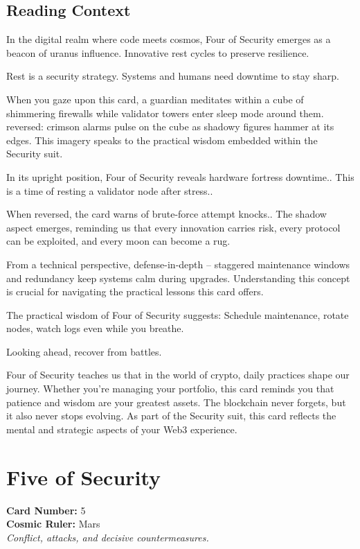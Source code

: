 \documentclass[11pt,oneside]{book}
\begin{document}
\begin{minipage}[t]{0.55\textwidth}
  \subsection*{Reading Context}
  In the digital realm where code meets cosmos, Four of Security emerges as a beacon of uranus influence. Innovative rest cycles to preserve resilience.

  Rest is a security strategy. Systems and humans need downtime to stay sharp.

  When you gaze upon this card, a guardian meditates within a cube of shimmering firewalls while validator towers enter sleep mode around them. reversed: crimson alarms pulse on the cube as shadowy figures hammer at its edges. This imagery speaks to the practical wisdom embedded within the Security suit.

  In its upright position, Four of Security reveals hardware fortress downtime.. This is a time of resting a validator node after stress..

  When reversed, the card warns of brute-force attempt knocks.. The shadow aspect emerges, reminding us that every innovation carries risk, every protocol can be exploited, and every moon can become a rug.

  From a technical perspective, defense-in-depth – staggered maintenance windows and redundancy keep systems calm during upgrades. Understanding this concept is crucial for navigating the practical lessons this card offers.

  The practical wisdom of Four of Security suggests: Schedule maintenance, rotate nodes, watch logs even while you breathe.

  Looking ahead, recover from battles.

  Four of Security teaches us that in the world of crypto, daily practices shape our journey. Whether you're managing your portfolio, this card reminds you that patience and wisdom are your greatest assets. The blockchain never forgets, but it also never stops evolving. As part of the Security suit, this card reflects the mental and strategic aspects of your Web3 experience.

\end{minipage}

\newpage
\section*{Five of Security}

\begin{minipage}[t]{0.55\textwidth}
  \vspace{0pt}
  \textbf{Card Number:} 5\\  \textbf{Cosmic Ruler:} Mars\\  \textit{Conflict, attacks, and decisive countermeasures.}
\end{minipage}
\end{document}
